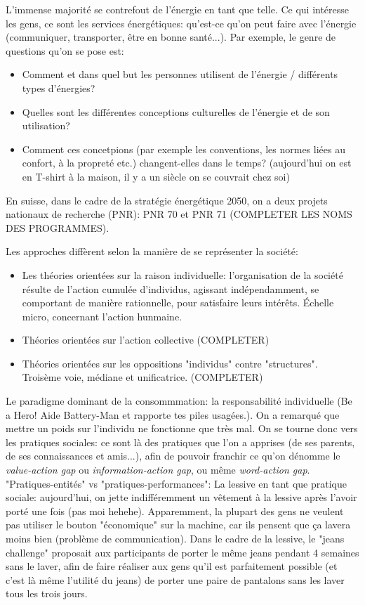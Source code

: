 \documentclass{article}
\begin{document}
 L'immense majorité se contrefout de l'énergie en tant que telle. Ce qui intéresse les gens, ce sont les services énergétiques: qu'est-ce qu'on peut faire avec l'énergie (communiquer, transporter, être en bonne santé...). Par exemple, le genre de questions qu'on se pose est:
 \begin{itemize}
 	\item Comment et dans quel but les personnes utilisent de l'énergie / différents types d'énergies?
 	\item Quelles sont les différentes conceptions culturelles de l'énergie et de son utilisation?
 	\item Comment ces concetpions (par exemple les conventions, les normes liées au confort, à la propreté etc.) changent-elles dans le temps? (aujourd'hui on est en T-shirt à la maison, il y a un siècle on se couvrait chez soi)
 \end{itemize}
En suisse, dans le cadre de la stratégie énergétique 2050, on a deux projets nationaux de recherche (PNR): PNR 70 et PNR 71 (COMPLETER LES NOMS DES PROGRAMMES). \par
Les approches diffèrent selon la manière de se représenter la société:
\begin{itemize}
	\item Les théories orientées sur la raison individuelle: l'organisation de la société résulte de l'action cumulée d'individus, agissant indépendamment, se comportant de manière rationnelle, pour satisfaire leurs intérêts. Échelle micro, concernant l'action hunmaine.
	\item Théories orientées sur l'action collective (COMPLETER)
	\item Théories orientées sur les oppositions "individus" contre "structures". Troisème voie, médiane et unificatrice. (COMPLETER)
\end{itemize}
 Le paradigme dominant de la consommmation: la responsabilité individuelle (Be a Hero! Aide Battery-Man et rapporte tes piles usagées.). On a remarqué que mettre un poids sur l'individu ne fonctionne que très mal. On se tourne donc vers les pratiques sociales: ce sont là des pratiques que l'on a apprises (de ses parents, de ses connaissances et amis...), afin de pouvoir franchir ce qu'on dénomme le \emph{value-action gap} ou \emph{information-action gap}, ou même \emph{word-action gap}. 
 "Pratiques-entités" vs "pratiques-performances": La lessive en tant que pratique sociale: aujourd'hui, on jette indifféremment un vêtement à la lessive après l'avoir porté une fois (pas moi hehehe). Apparemment, la plupart des gens ne veulent pas utiliser le bouton "économique" sur la machine, car ils pensent que ça lavera moins bien (problème de communication). Dans le cadre de la lessive, le "jeans challenge" proposait aux participants de porter le même jeans pendant 4 semaines sans le laver, afin de faire réaliser aux gens qu'il est parfaitement possible (et c'est là même l'utilité du jeans) de porter une paire de pantalons sans les laver tous les trois jours.\par
\end{document}

